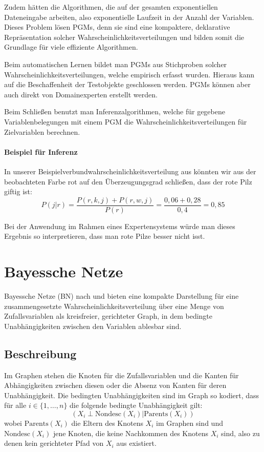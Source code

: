 \documentclass{llncs}
\begin{document}
Zudem hätten die Algorithmen, die auf der gesamten exponentiellen Dateneingabe arbeiten, also exponentielle Laufzeit in der Anzahl der Variablen. Dieses Problem lösen PGMs, denn sie sind eine kompaktere, deklarative Repräsentation solcher Wahrscheinlichkeitsverteilungen und bilden somit die Grundlage für viele effiziente Algorithmen.

Beim automatischen Lernen bildet man PGMs aus Stichproben solcher Wahrscheinlichkeitsverteilungen, welche empirisch erfasst wurden. Hieraus kann auf die Beschaffenheit der Testobjekte geschlossen werden. PGMs können aber auch direkt von Domainexperten erstellt werden. 


Beim Schließen benutzt man Inferenzalgorithmen, welche für gegebene Variablenbelegungen mit einem PGM die Wahrscheinlichkeitsverteilungen für Zielvariablen berechnen. 

\paragraph{Beispiel für Inferenz} In unserer Beispielverbundwahrscheinlichkeitsverteilung aus  könnten wir aus der beobachteten Farbe rot auf den Überzeugungsgrad schließen, dass der rote Pilz giftig ist:
\[P(j|r) = \frac{P(r,k,j)+P(r,w,j)}{P(r)} = \frac{0,06+0,28}{0,4} = 0,85\]

Bei der Anwendung im Rahmen eines Expertensystems würde man dieses Ergebnis so interpretieren, dass man rote Pilze besser nicht isst. 

\section{Bayessche Netze}

Bayessche Netze (BN) nach \cite{pearl1988probabilistic} und \cite{koller2009probabilistic} bieten eine kompakte Darstellung für eine zusammengesetzte Wahrscheinlichkeitsverteilung über eine Menge von Zufallsvariablen als kreisfreier, gerichteter Graph, in dem bedingte Unabhängigkeiten zwischen den Variablen ablesbar sind. 

\subsection{Beschreibung}

Im Graphen stehen die Knoten für die Zufallsvariablen und die Kanten für Abhängigkeiten zwischen diesen oder die Absenz von Kanten für deren Unabhängigkeit. Die bedingten Unabhängigkeiten sind im Graph so kodiert, dass für alle $i \in \{1,\dots,n\}$ die folgende bedingte Unabhängigkeit gilt:
\[ ( X_i \perp \mbox{Nondesc}(X_i) | \mbox{Parents}(X_i) )\]
wobei $\mbox{Parents}(X_i)$ die Eltern des Knotens $X_i$ im Graphen sind und $\mbox{Nondesc}(X_i)$ jene Knoten, die keine Nachkommen des Knotens $X_i$ sind, also zu denen kein gerichteter Pfad von $X_i$ aus existiert. 
\end{document}

